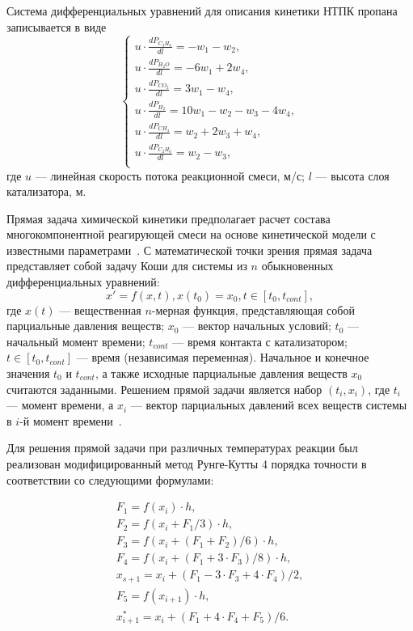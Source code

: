 \documentclass{cmi}
\begin{document}
Система дифференциальных уравнений для описания кинетики НТПК пропана записывается в виде
\begin{equation}
\begin{cases}
\displaystyle u\cdot \frac{dP_{C_{3}H_{8}}}{dl} = -w_{1}-w_{2},\\
\displaystyle u\cdot \frac{dP_{H_{2}O}}{dl} = -6w_{1}+2w_{4},\\
\displaystyle u\cdot \frac{dP_{CO_{2}}}{dl} = 3w_{1}-w_{4},\\
\displaystyle u\cdot \frac{dP_{H_{2}}}{dl} = 10w_{1}-w_{2}-w_{3}-4w_{4},\\
\displaystyle u\cdot \frac{dP_{CH_{4}}}{dl} = w_{2}+2w_{3}+w_{4},\\
\displaystyle u\cdot \frac{dP_{C_{2}H_{6}}}{dl} = w_{2}-w_{3},\\
\end{cases}
\end{equation}
где $u$ --- линейная скорость потока реакционной смеси, м/с; $l$ --- высота слоя катализатора, м.

Прямая задача химической кинетики предполагает расчет состава многокомпонентной реагирующей смеси на основе кинетической модели с известными параметрами~\cite{MazitovOAG16:ru}.
С математической точки зрения прямая задача представляет собой задачу Коши для системы из $n$ обыкновенных дифференциальных уравнений:
\begin{equation}
x'=f(x, t), x(t_{0}) = x_{0}, t\in[t_{0},t_{cont}],
\end{equation}
где $x(t)$ --- вещественная $n$-мерная функция, представляющая собой парциальные давления веществ; $x_{0}$ --- вектор начальных условий; $t_{0}$ --- начальный момент времени; $t_{cont}$ --- время контакта с катализатором; $t \in [t_{0},t_{cont}]$ --- время (независимая переменная).
Начальное и конечное значения $t_{0}$ и $t_{cont}$, а также исходные парциальные давления веществ $x_{0}$ считаются заданными.
Решением прямой задачи является набор $(t_i, x_i)$, где $t_i$ --- момент времени, а $x_i$ --- вектор парциальных давлений всех веществ системы в $i$-й момент времени~\cite{MazitovOAG16:ru}.

Для решения прямой задачи при различных температурах реакции был реализован модифицированный метод Рунге-Кутты 4 порядка точности в соответствии со следующими формулами:

\begin{equation}
\begin{array}{l}
F_{1}=f(x_{i})\cdot h,\\
F_{2}=f(x_{i}+F_{1}/3)\cdot h,\\
F_{3}=f(x_{i}+(F_{1}+F_{2})/6)\cdot h,\\
F_{4}=f(x_{i}+(F_{1}+3 \cdot F_{3})/8)\cdot h,\\
x_{s+1}=x_{i} + (F_{1}-3 \cdot F_{3} + 4 \cdot F_{4})/ 2,\\
F_{5}=f(x_{i+1})\cdot h,\\
x^*_{i+1}=x_{i} + (F_{1}+4 \cdot F_{4} + F_{5})/ 6.\\
\end{array}
\end{equation}
\end{document}
